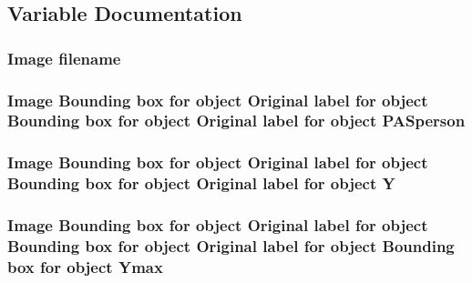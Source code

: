 \subsection{Variable Documentation}
\subsubsection[{\texorpdfstring{filename}{filename}}]{\setlength{\rightskip}{0pt plus 5cm}Image filename}\hypertarget{crop001512_8txt_a8fb7cd54abaa35f0affcd036288e33b1}{}\label{crop001512_8txt_a8fb7cd54abaa35f0affcd036288e33b1}
\subsubsection[{\texorpdfstring{P\+A\+Sperson}{PASperson}}]{\setlength{\rightskip}{0pt plus 5cm}Image Bounding box for object Original label for object Bounding box for object Original label for object P\+A\+Sperson}\hypertarget{crop001512_8txt_a5e39cc2f8901d4958113d54075314fae}{}\label{crop001512_8txt_a5e39cc2f8901d4958113d54075314fae}
\subsubsection[{\texorpdfstring{Y}{Y}}]{\setlength{\rightskip}{0pt plus 5cm}Image Bounding box for object Original label for object Bounding box for object Original label for object Y}\hypertarget{crop001512_8txt_af3b1f3841810e39f13473ad32744a6c5}{}\label{crop001512_8txt_af3b1f3841810e39f13473ad32744a6c5}
\subsubsection[{\texorpdfstring{Ymax}{Ymax}}]{\setlength{\rightskip}{0pt plus 5cm}Image Bounding box for object Original label for object Bounding box for object Original label for object Bounding box for object Ymax}\hypertarget{crop001512_8txt_a5e09200f24fba566f16b31d5e57d6834}{}\label{crop001512_8txt_a5e09200f24fba566f16b31d5e57d6834}
